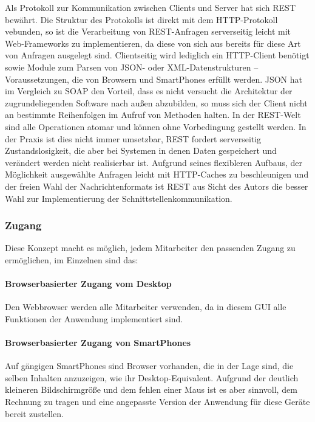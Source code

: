 Als Protokoll zur Kommunikation zwischen Clients und Server hat sich REST bewährt. Die Struktur des Protokolls ist direkt mit dem HTTP-Protokoll vebunden, so ist die Verarbeitung von REST-Anfragen serverseitig leicht mit Web-Frameworks zu implementieren, da diese von sich aus bereits für diese Art von Anfragen ausgelegt sind. Clientseitig wird lediglich ein HTTP-Client benötigt sowie Module zum Parsen von JSON- oder XML-Datenstrukturen -- Voraussetzungen, die von Browsern und SmartPhones erfüllt werden. JSON hat im Vergleich zu SOAP den Vorteil, dass es nicht versucht die Architektur der zugrundeliegenden Software nach außen abzubilden, so muss sich der Client nicht an bestimmte Reihenfolgen im Aufruf von Methoden halten. In der REST-Welt sind alle Operationen atomar und können ohne Vorbedingung gestellt werden. In der Praxis ist dies nicht immer umsetzbar, REST fordert serverseitig Zustandslosigkeit, die aber bei Systemen in denen Daten gespeichert und verändert werden nicht realisierbar ist. Aufgrund seines flexibleren Aufbaus, der Möglichkeit ausgewählte Anfragen leicht mit HTTP-Caches zu beschleunigen und der freien Wahl der Nachrichtenformats ist REST aus Sicht des Autors die besser Wahl zur Implementierung der Schnittstellenkommunikation.

\subsubsection{Zugang}

Diese Konzept macht es möglich, jedem Mitarbeiter den passenden Zugang zu ermöglichen, im Einzelnen sind das:

\paragraph{Browserbasierter Zugang vom Desktop} Den Webbrowser werden alle Mitarbeiter verwenden, da in diesem GUI alle Funktionen der Anwendung implementiert sind.

\paragraph{Browserbasierter Zugang von SmartPhones} Auf gängigen SmartPhones sind Browser vorhanden, die in der Lage sind, die selben Inhalten anzuzeigen, wie ihr Desktop-Equivalent. Aufgrund der deutlich kleineren Bildschirmgröße und dem fehlen einer Maus ist es aber sinnvoll, dem Rechnung zu tragen und eine angepasste Version der Anwendung für diese Geräte bereit zustellen. 


